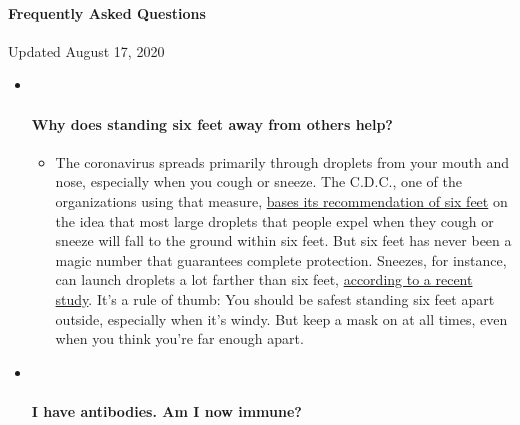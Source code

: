 \hypertarget{frequently-asked-questions}{%
\paragraph{Frequently Asked
Questions}\label{frequently-asked-questions}}

Updated August 17, 2020

\begin{itemize}
\item ~
  \hypertarget{why-does-standing-six-feet-away-from-others-help}{%
  \paragraph{Why does standing six feet away from others
  help?}\label{why-does-standing-six-feet-away-from-others-help}}

  \begin{itemize}
  \tightlist
  \item
    The coronavirus spreads primarily through droplets from your mouth
    and nose, especially when you cough or sneeze. The C.D.C., one of
    the organizations using that measure,
    \href{https://www.nytimes3xbfgragh.onion/2020/04/14/health/coronavirus-six-feet.html?action=click\&pgtype=Article\&state=default\&region=MAIN_CONTENT_3\&context=storylines_faq}{bases
    its recommendation of six feet} on the idea that most large droplets
    that people expel when they cough or sneeze will fall to the ground
    within six feet. But six feet has never been a magic number that
    guarantees complete protection. Sneezes, for instance, can launch
    droplets a lot farther than six feet,
    \href{https://jamanetwork.com/journals/jama/fullarticle/2763852}{according
    to a recent study}. It's a rule of thumb: You should be safest
    standing six feet apart outside, especially when it's windy. But
    keep a mask on at all times, even when you think you're far enough
    apart.
  \end{itemize}
\item ~
  \hypertarget{i-have-antibodies-am-i-now-immune}{%
  \paragraph{I have antibodies. Am I now
  immune?}\label{i-have-antibodies-am-i-now-immune}}


\end{itemize}
